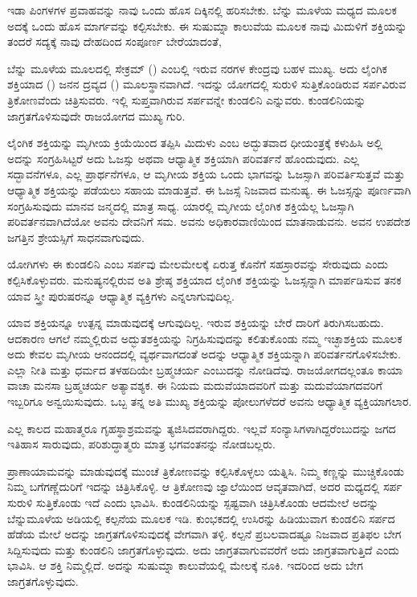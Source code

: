 ಇಡಾ ಪಿಂಗಳಗಳ ಪ್ರವಾಹವನ್ನು ನಾವು ಒಂದು ಹೊಸ ದಿಕ್ಕಿನಲ್ಲಿ ಹರಿಸಬೇಕು. ಬೆನ್ನು ಮೂಳೆಯ ಮಧ್ಯದ ಮೂಲಕ ಅದಕ್ಕೆ ಒಂದು ಹೊಸ ಮಾರ್ಗವನ್ನು ಕಲ್ಪಿಸಬೇಕು. ಈ ಸುಷುಮ್ನಾ ಕಾಲುವೆಯ ಮೂಲಕ ನಾವು ಮಿದುಳಿಗೆ ಶಕ್ತಿಯನ್ನು ತಂದರೆ ಸದ್ಯಕ್ಕೆ ನಾವು ದೇಹದಿಂದ ಸಂಪೂರ್ಣ ಬೇರೆಯಾದಂತೆ,

ಬೆನ್ನು ಮೂಳೆಯ ಮೂಲದಲ್ಲಿ ಸೇಕ್ರಮ್ () ಎಂಬಲ್ಲಿ ಇರುವ ನರಗಳ ಕೇಂದ್ರವು ಬಹಳ ಮುಖ್ಯ. ಅದು ಲೈಂಗಿಕ ಶಕ್ತಿಯಾದ () ಜನನ ದ್ರವ್ಯದ () ಮೂಲಸ್ಥಾನವಾಗಿದೆ. ಇದನ್ನು ಯೋಗದಲ್ಲಿ ಸುರುಳಿ ಸುತ್ತಿಕೊಂಡಿರುವ ಸರ್ಪವಿರುವ ತ್ರಿಕೋಣವೆಂದು ಚಿತ್ರಿಸುವರು. ಇಲ್ಲಿ ಸುಪ್ತವಾಗಿರುವ ಸರ್ಪವನ್ನೇ ಕುಂಡಲಿನಿ ಎನ್ನುವರು. ಕುಂಡಲಿನಿಯನ್ನು ಜಾಗ್ರತಗೊಳಿಸುವುದೇ ರಾಜಯೋಗದ ಮುಖ್ಯ ಗುರಿ.

ಲೈಂಗಿಕ ಶಕ್ತಿಯನ್ನು ಮೃಗೀಯ ಕ್ರಿಯೆಯಿಂದ ತಪ್ಪಿಸಿ ಮಿದುಳು ಎಂಬ ಅದ್ಭುತವಾದ ಧೀಯಂತ್ರಕ್ಕೆ ಕಳುಹಿಸಿ ಅಲ್ಲಿ ಅದನ್ನು ಸಂಗ್ರಹಿಸಿಟ್ಟರೆ ಅದು ಓಜಸ್ಸು ಅಥವಾ ಆಧ್ಯಾತ್ಮಿಕ ಶಕ್ತಿಯಾಗಿ ಪರಿವರ್ತನೆ ಹೊಂದುವುದು. ಎಲ್ಲ ಸದ್ಭಾವನೆಗಳೂ, ಎಲ್ಲ ಪ್ರಾರ್ಥನೆಗಳೂ, ಆ ಮೃಗೀಯ ಶಕ್ತಿಯ ಒಂದು ಭಾಗವನ್ನು ಓಜಸ್ಸಾಗಿ ಪರಿವರ್ತಿಸುತ್ತವೆ ಮತ್ತು ಆಧ್ಯಾತ್ಮಿಕ ಶಕ್ತಿಯನ್ನು ಪಡೆಯಲು ಸಹಾಯ ಮಾಡುತ್ತವೆ. ಈ ಓಜಸ್ಸೆ ನಿಜವಾದ ಮನುಷ್ಯ. ಈ ಓಜಸ್ಸನ್ನು ಪೂರ್ಣವಾಗಿ ಸಂಗ್ರಹಿಸುವುದು ಮಾನವ ಜನ್ಮದಲ್ಲಿ ಮಾತ್ರ ಸಾಧ್ಯ. ಯಾರಲ್ಲಿ ಮೃಗೀಯ ಲೈಂಗಿಕ ಶಕ್ತಿಯೆಲ್ಲ ಓಜಸ್ಸಾಗಿ ಪರಿವರ್ತನವಾಗಿದೆಯೋ ಅವನು ದೇವನಿಗೆ ಸಮ. ಅವನು ಅಧಿಕಾರವಾಣಿಯಿಂದ ಮಾತನಾಡುವನು. ಅವನ ಉಪದೇಶ ಜಗತ್ತಿನ ಶ್ರೇಯಸ್ಸಿಗೆ ಸಾಧನವಾಗುವುದು.

ಯೋಗಿಗಳು ಈ ಕುಂಡಲಿನಿ ಎಂಬ ಸರ್ಪವು ಮೇಲಮೇಲಕ್ಕೆ ಏರುತ್ತ ಕೊನೆಗೆ ಸಹಸ್ರಾರವನ್ನು ಸೇರುವುದು ಎಂದು ಕಲ್ಪಿಸಿಕೊಳ್ಳುವರು. ಮನುಷ್ಯನಲ್ಲಿರುವ ಅತಿ ಶ್ರೇಷ್ಠ ಶಕ್ತಿಯಾದ ಲೈಂಗಿಕ ಶಕ್ತಿಯನ್ನು ಓಜಸ್ಸನ್ನಾಗಿ ಮಾರ್ಪಡಿಸುವ ತನಕ ಯಾವ ಸ್ತ್ರೀ ಪುರುಷರನ್ನೂ ಆಧ್ಯಾತ್ಮಿಕ ವ್ಯಕ್ತಿಗಳು ಎನ್ನಲಾಗುವುದಿಲ್ಲ.

ಯಾವ ಶಕ್ತಿಯನ್ನೂ ಉತ್ಪನ್ನ ಮಾಡುವುದಕ್ಕೆ ಆಗುವುದಿಲ್ಲ. ಇರುವ ಶಕ್ತಿಯನ್ನು ಬೇರೆ ದಾರಿಗೆ ತಿರುಗಿಸಬಹುದು. ಆದಕಾರಣ ಆಗಲೆ ನಮ್ಮಲ್ಲಿರುವ ಅದ್ಭುತಶಕ್ತಿಯನ್ನು ನಿಗ್ರಹಿಸುವುದನ್ನು ಕಲಿತುಕೊಂಡು ನಮ್ಮ ಇಚ್ಛಾಶಕ್ತಿಯ ಮೂಲಕ ಅದು ಕೇವಲ ಮೃಗೀಯ ಆನಂದದಲ್ಲಿ ವ್ಯರ್ಥವಾಗದಂತೆ ಅದನ್ನು ಆಧ್ಯಾತ್ಮಿಕ ಶಕ್ತಿಯನ್ನಾಗಿ ಪರಿವರ್ತನಗೊಳಿಸಬೇಕು. ಎಲ್ಲಾ ನೀತಿ ಮತ್ತು ಧರ್ಮದ ತಳಹದಿಯೇ ಬ್ರಹ್ಮಚರ್ಯ ಎಂಬುದನ್ನು ನೋಡಿದೆವು. ರಾಜಯೋಗದಲ್ಲಂತೂ ಕಾಯಾ ವಾಚಾ ಮನಸಾ ಬ್ರಹ್ಮಚರ್ಯ ಅತ್ಯಾವಶ್ಯಕ. ಈ ನಿಯಮ ಮದುವೆಯಾದವರಿಗೆ ಮತ್ತು ಮದುವೆಯಾಗದವರಿಗೆ ಇಬ್ಬರಿಗೂ ಅನ್ವಯಿಸುವುದು. ಒಬ್ಬ ತನ್ನ ಅತಿ ಮುಖ್ಯ ಶಕ್ತಿಯನ್ನು ಪೋಲುಗಳೆದರೆ ಅವನು ಆಧ್ಯಾತ್ಮಿಕ ವ್ಯಕ್ತಿಯಾಗಲಾರ.

ಎಲ್ಲ ಕಾಲದ ಮಹಾತ್ಮರೂ ಗೃಹಸ್ಥಾಶ್ರಮವನ್ನು ತ್ಯಜಿಸಿದವರಾಗಿದ್ದರು. ಇಲ್ಲವೆ ಸಂನ್ಯಾಸಿಗಳಾಗಿದ್ದರೆಂಬುದನ್ನು ಜಗದ ಇತಿಹಾಸ ಸಾರುವುದು, ಪರಿಶುದ್ಧಾತ್ಮರು ಮಾತ್ರ ಭಗವಂತನನ್ನು ನೋಡಬಲ್ಲರು.

ಪ್ರಾಣಾಯಾಮವನ್ನು ಮಾಡುವುದಕ್ಕೆ ಮುಂಚೆ ತ್ರಿಕೋಣವನ್ನು ಕಲ್ಪಿಸಿಕೊಳ್ಳಲು ಯತ್ನಿಸಿ. ನಿಮ್ಮ ಕಣ್ಣನ್ನು ಮುಚ್ಚಿಕೊಂಡು ನಿಮ್ಮ ಬಗೆಗಣ್ಣೆದುರಿಗೆ ಇದನ್ನು ಚಿತ್ರಿಸಿಕೊಳ್ಳಿ. ಆ ತ್ರಿಕೋಣವು ಜ್ವಾಲೆಯಿಂದ ಆವೃತವಾಗಿದೆ, ಅದರ ಮಧ್ಯದಲ್ಲಿ ಸರ್ಪ ಸುರುಳಿ ಸುತ್ತಿಕೊಂಡು ಇದೆ ಎಂದು ಭಾವಿಸಿ. ಕುಂಡಲಿನಿಯನ್ನು ಸ್ಪಷ್ಟವಾಗಿ ಚಿತ್ರಿಸಿಕೊಂಡು ಆದಮೇಲೆ ಅದನ್ನು ಬೆನ್ನುಮೂಳೆಯ ಅಡಿಯಲ್ಲಿ ಕಲ್ಪನೆಯ ಮೂಲಕ ಇಡಿ. ಕುಂಭಕದಲ್ಲಿ ಉಸಿರನ್ನು ಹಿಡಿಯುವಾಗ ಕುಂಡಲಿನಿ ಸರ್ಪದ ಹೆಡೆಯ ಮೇಲೆ ಅದನ್ನು ಜಾಗ್ರತಗೊಳಿಸುವುದಕ್ಕೆ ವೇಗವಾಗಿ ತಳ್ಳಿ. ಕಲ್ಪನೆ ಪ್ರಬಲವಾದಷ್ಟೂ ನಿಜವಾದ ಪ್ರತಿಫಲ ಬೇಗ ಸಿದ್ದಿಸುವುದು ಮತ್ತು ಕುಂಡಲಿನಿ ಜಾಗ್ರತಗೊಳ್ಳುವುದು. ಅದು ಜಾಗ್ರತವಾಗುವವರೆಗೆ ಅದು ಜಾಗ್ರತವಾಗುತ್ತಿದೆ ಎಂದು ಭಾವಿಸಿ. ಆ ಶಕ್ತಿ ನಿಮ್ಮಲ್ಲಿದೆ. ಅದನ್ನು ಸುಷುಮ್ನಾ ಕಾಲುವೆಯಲ್ಲಿ ಮೇಲಕ್ಕೆ ನೂಕಿ. ಇದರಿಂದ ಅದು ಬೇಗ ಜಾಗ್ರತಗೊಳ್ಳುವುದು.

